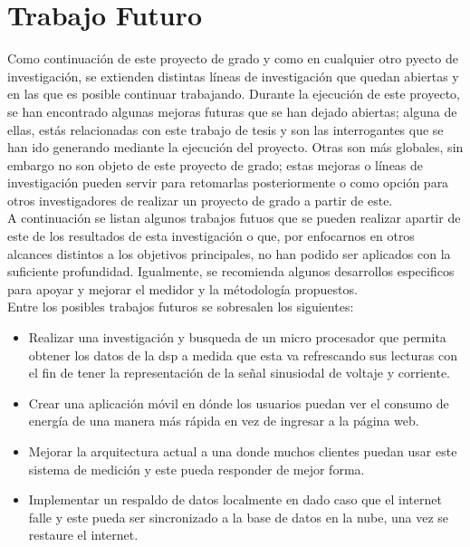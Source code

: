\chapter{ Trabajo Futuro}
Como continuación de este proyecto de grado y como en cualquier otro pyecto de investigación, se extienden distintas líneas de investigación que quedan abiertas y en las que es posible continuar trabajando. Durante la ejecución de este proyecto, se han encontrado algunas mejoras futuras que se han dejado abiertas; alguna de ellas, estás relacionadas con este trabajo de tesis y son las interrogantes que se han ido generando mediante la ejecución del proyecto. Otras son más globales, sin embargo no son objeto de este proyecto de grado; estas mejoras o líneas de investigación pueden servir para retomarlas posteriormente o como opción para otros investigadores de realizar un proyecto de grado a partir de este. \\

A continuación se listan algunos trabajos futuos que se pueden realizar apartir de este de los resultados de esta investigación o que, por enfocarnos en otros alcances distintos a los objetivos principales, no han podido ser aplicados con la suficiente profundidad. Igualmente, se recomienda algunos desarrollos especificos para apoyar y mejorar el medidor y la métodología propuestos. \\
Entre los posibles trabajos futuros se sobresalen los siguientes:

\begin{itemize}
    \itemsep0em
    \item Realizar una investigación y busqueda de un micro procesador que permita obtener los datos de la dsp a medida que esta va refrescando sus lecturas con el fin de tener la representación de la señal sinusiodal de voltaje y corriente.
    \item Crear una aplicación móvil en dónde los usuarios puedan ver el consumo de energía de una manera más rápida en vez de ingresar a la página web.
    \item Mejorar la arquitectura actual a una donde muchos clientes puedan usar este sistema de medición y este pueda responder de mejor forma.
    \item Implementar un respaldo de datos localmente en dado caso que el internet falle y este pueda ser sincronizado a la base de datos en la nube, una vez se restaure el internet.
\end{itemize}